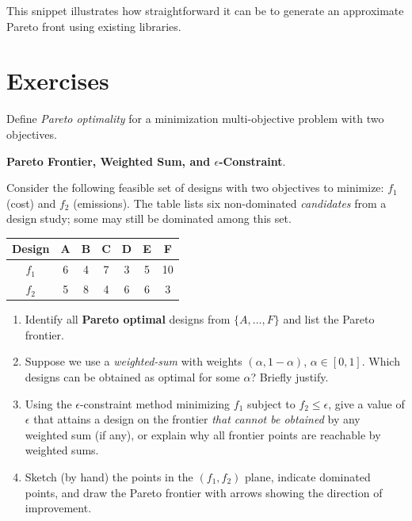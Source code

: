 This snippet illustrates how straightforward it can be to generate an approximate Pareto front using existing libraries.


\section{Exercises}

\begin{ex}{}{}
Define \emph{Pareto optimality} for a minimization multi-objective problem with two objectives.
\end{ex}
\begin{ex}{}{}
\textbf{Pareto Frontier, Weighted Sum, and $\epsilon$-Constraint}.

Consider the following feasible set of designs with two objectives to minimize: $f_1$ (cost) and $f_2$ (emissions).
The table lists six non-dominated \emph{candidates} from a design study; some may still be dominated among this set.

\begin{center}
\begin{tabular}{c|cccccc}
Design & A & B & C & D & E & F \\\hline
$f_1$  & 6 & 4 & 7 & 3 & 5 & 10 \\
$f_2$  & 5 & 8 & 4 & 6 & 6 & 3 \\
\end{tabular}
\end{center}

\begin{enumerate}
\item Identify all \textbf{Pareto optimal} designs from $\{A,\ldots,F\}$ and list the Pareto frontier.
\vspace{2cm}

\item Suppose we use a \emph{weighted-sum} with weights $(\alpha,1-\alpha)$, $\alpha\in[0,1]$. Which designs can be obtained as optimal for some $\alpha$? Briefly justify.



\vspace{2cm}

\item Using the $\epsilon$-constraint method minimizing $f_1$ subject to $f_2\le \epsilon$, give a value of $\epsilon$ that attains a design on the frontier \emph{that cannot be obtained} by any weighted sum (if any), or explain why all frontier points are reachable by weighted sums.

\vspace{2cm}


\item Sketch (by hand) the points in the $(f_1,f_2)$ plane, indicate dominated points, and draw the Pareto frontier with arrows showing the direction of improvement.

\vspace{6cm}
\end{enumerate}

\end{ex}


